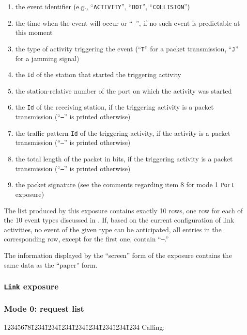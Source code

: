 \begin{enumerate}
\item
the event identifier (e.g., ``{\tt ACTIVITY}'', ``{\tt BOT}'',
``{\tt COLLISION}'')
\item
the time when the event will occur or ``{\tt ---}'', if no such event is
predictable at this moment
\item
the type of activity triggering the event (``{\tt T}'' for a packet
transmission, ``{\tt J}'' for a jamming signal)
\item
the {\tt Id} of the station that started the triggering activity
\item
the station-relative number of the port on which the activity was started
\item
the {\tt Id} of the receiving station, if the triggering activity is a
packet transmission (``{\tt ---}'' is printed otherwise)
\item
the traffic pattern {\tt Id} of the triggering activity,
if the activity is a
packet transmission (``{\tt ---}'' is printed otherwise)
\item
the total length of the packet in bits,
if the triggering activity is a
packet transmission (``{\tt ---}'' is printed otherwise)
\item
the packet signature (see the comments regarding item 8 for mode 1
{\tt Port} exposure)
\end{enumerate}

The list produced by this exposure contains exactly 10 rows, one row
for each of the 10 event types discussed in .
If, based on the current configuration of link activities,
no event of the given type can be anticipated, all entries in
the corresponding row, except for the first one, contain ``{\tt ---}.''

The information displayed by the ``screen'' form of the exposure contains the
same data as the ``paper'' form.

\subsubsection{{\tt Link} exposure}
\label{rm_ex_se_li}

\subsubsection*{Mode 0: request list}

{\tt\begin{tabbing}
12345678\=1234\=1234\=1234\=1234\=1234\=1234\=1234\=1234\kill
{\rm Calling:}
\end{tabbing}}

